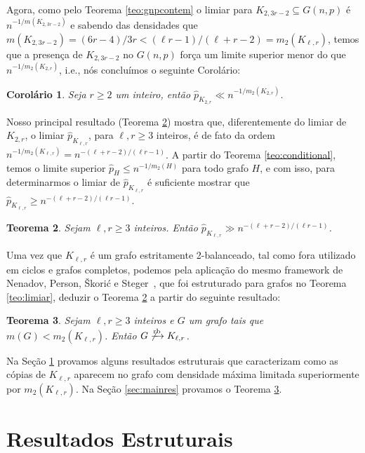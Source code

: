 \documentclass[12pt,a4paper]{book}
\newcommand{\K}{K_{\ell,r}} %
\newcommand{\rb}{\xrightarrow{\text{\rm rb}}}
\let\subset\subseteq
\newtheorem{teorema}{Teorema}[chapter]
\newtheorem{corolario} [teorema] {Corolário}
\begin{document}
    Agora, como pelo Teorema \ref{teo:gnpcontem}  o limiar para
    $K_{2,3r-2}\subset G(n,p)$ é $n^{-1/m(K_{2,3r-2})}$ e sabendo das densidades que
    $m(K_{2,3r-2}) = (6r-4)/3r < (\ell r - 1)/(\ell+r-2) =
    m_2(K_{\ell,r})$, 
    temos que a presença de $K_{2,3r-2}$ no $G(n,p)$ força um limite superior menor do que
     $n^{-1/m_2(K_{2,r})}$, i.e., nós concluímos o seguinte Corolário:
     
    \begin{corolario}\label{cor:k2r}
        Seja $r\geq 2$ um inteiro, então $\hat{p}_{K_{2,r}} \ll n^{-1/m_2(K_{2,r})}$.
    \end{corolario}
    
    Nosso principal resultado (Teorema \ref{teo:mainrb}) mostra que, diferentemente do limiar de $K_{2,r}$,
    o limiar $\hat{p}_{\K}$, para $\ell,r \geq 3$ inteiros, é de fato da ordem 
    $n^{-1/m_2(\K)} = n^{-(\ell+r-2)/(\ell r-1)}$.
    A partir do Teorema \ref{teo:conditional}, temos o limite superior $\hat{p}_H \leq n^{-1/m_2(H)}$ para todo grafo $H$, e com isso, para determinarmos o limiar de $\hat{p}_{\K}$ é suficiente mostrar que 
    $\hat{p}_{\K}\geq n^{-(\ell+r-2)/(\ell r - 1)}$.

    \begin{teorema}\label{teo:mainrb} 
    Sejam $\ell,r \geq 3$ inteiros. 
    Então $\hat{p}_{K_{\ell,r}}\gg n^{-(\ell+r-2)/(\ell r - 1)}$.
    \end{teorema}

    Uma vez que $\K$ é um grafo estritamente 2-balanceado, tal como fora utilizado em ciclos e grafos completos, podemos pela aplicação do mesmo framework de Nenadov, Person, Škorić e Steger~\cite{NePeSkSt14}, que foi estruturado para grafos no Teorema \ref{teo:limiar}, deduzir o Teorema \ref{teo:mainrb} a partir do seguinte resultado: %
    
    \begin{teorema}\label{lemma:main} 
        Sejam $\ell,r \geq 3$ inteiros e
        $G$ um grafo tais que
        $m(G) < m_2(\K)$.
        Então $G \not\rb \K$.
    \end{teorema}

    Na Seção \ref{sec:rbestrut} provamos alguns resultados estruturais que caracterizam como as cópias de $\K$ aparecem no grafo com densidade máxima limitada superiormente por $m_2(\K)$.
    Na Seção \ref{sec:mainres} provamos o Teorema \ref{lemma:main}.

\section{Resultados Estruturais}
\label{sec:rbestrut}
\end{document}
